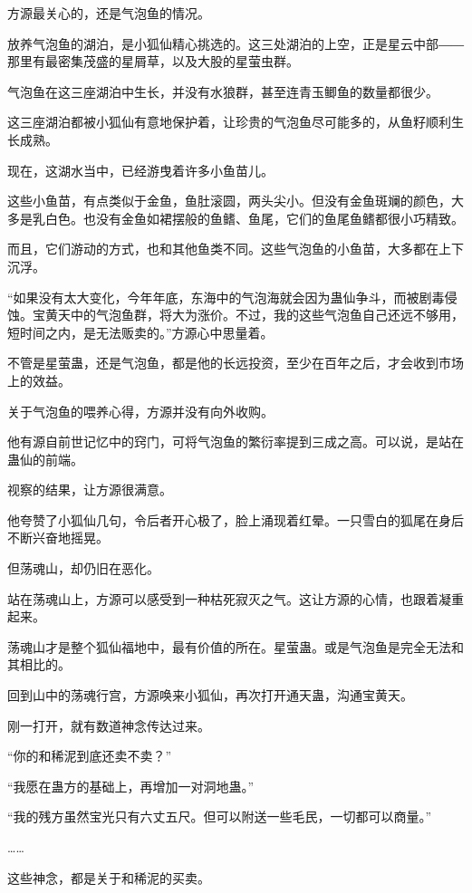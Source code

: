
\begin{this_body}

方源最关心的，还是气泡鱼的情况。

放养气泡鱼的湖泊，是小狐仙精心挑选的。这三处湖泊的上空，正是星云中部――那里有最密集茂盛的星屑草，以及大股的星萤虫群。

气泡鱼在这三座湖泊中生长，并没有水狼群，甚至连青玉鲫鱼的数量都很少。

这三座湖泊都被小狐仙有意地保护着，让珍贵的气泡鱼尽可能多的，从鱼籽顺利生长成熟。

现在，这湖水当中，已经游曳着许多小鱼苗儿。

这些小鱼苗，有点类似于金鱼，鱼肚滚圆，两头尖小。但没有金鱼斑斓的颜色，大多是乳白色。也没有金鱼如裙摆般的鱼鳍、鱼尾，它们的鱼尾鱼鳍都很小巧精致。

而且，它们游动的方式，也和其他鱼类不同。这些气泡鱼的小鱼苗，大多都在上下沉浮。

“如果没有太大变化，今年年底，东海中的气泡海就会因为蛊仙争斗，而被剧毒侵蚀。宝黄天中的气泡鱼群，将大为涨价。不过，我的这些气泡鱼自己还远不够用，短时间之内，是无法贩卖的。”方源心中思量着。

不管是星萤蛊，还是气泡鱼，都是他的长远投资，至少在百年之后，才会收到市场上的效益。

关于气泡鱼的喂养心得，方源并没有向外收购。

他有源自前世记忆中的窍门，可将气泡鱼的繁衍率提到三成之高。可以说，是站在蛊仙的前端。

视察的结果，让方源很满意。

他夸赞了小狐仙几句，令后者开心极了，脸上涌现着红晕。一只雪白的狐尾在身后不断兴奋地摇晃。

但荡魂山，却仍旧在恶化。

站在荡魂山上，方源可以感受到一种枯死寂灭之气。这让方源的心情，也跟着凝重起来。

荡魂山才是整个狐仙福地中，最有价值的所在。星萤蛊。或是气泡鱼是完全无法和其相比的。

回到山中的荡魂行宫，方源唤来小狐仙，再次打开通天蛊，沟通宝黄天。

刚一打开，就有数道神念传达过来。

“你的和稀泥到底还卖不卖？”

“我愿在蛊方的基础上，再增加一对洞地蛊。”

“我的残方虽然宝光只有六丈五尺。但可以附送一些毛民，一切都可以商量。”

……

这些神念，都是关于和稀泥的买卖。


\end{this_body}
